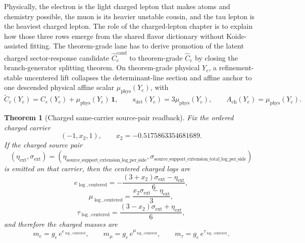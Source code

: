 \documentclass[11pt]{article}
\newtheorem{theorem}{Theorem}[section]
\begin{document}
Physically, the electron is the light charged lepton that makes atoms and chemistry possible, the
muon is its heavier unstable cousin, and the tau lepton is the heaviest charged lepton. The role
of the charged-lepton chapter is to explain how those three rows emerge from the shared flavor
dictionary without Koide-assisted fitting. The theorem-grade lane has to derive promotion of the
latent charged sector-response candidate \(\widehat C_e^{\mathrm{cand}}\) to theorem-grade
\(\widehat C_e\) by closing the branch-generator splitting theorem. On theorem-grade physical
\(Y_e\), a refinement-stable uncentered lift collapses the determinant-line section and affine
anchor to one descended physical affine scalar \(\mu_{\mathrm{phys}}(Y_e)\), with
\[
\widetilde C_e(Y_e)=\widehat C_e(Y_e)+\mu_{\mathrm{phys}}(Y_e)\,\mathbf 1,
\qquad
s_{\det}(Y_e)=3\mu_{\mathrm{phys}}(Y_e),
\qquad
A_{\mathrm{ch}}(Y_e)=\mu_{\mathrm{phys}}(Y_e).
\]

\begin{theorem}[Charged same-carrier source-pair readback]
Fix the ordered charged carrier
\[
(-1,x_2,1),
\qquad
x_2=-0.5175863354681689.
\]
If the charged source pair
\[
(\eta_{\mathrm{ext}},\sigma_{\mathrm{ext}})
=
(\eta_{\mathrm{source\_support\_extension\_log\_per\_side}},
\sigma_{\mathrm{source\_support\_extension\_total\_log\_per\_side}})
\]
is emitted on that carrier, then the centered charged logs are
\[
e_{\log,\mathrm{centered}}
=
-\frac{(3+x_2)\sigma_{\mathrm{ext}}-\eta_{\mathrm{ext}}}{6},
\]
\[
\mu_{\log,\mathrm{centered}}
=
\frac{x_2\sigma_{\mathrm{ext}}-\eta_{\mathrm{ext}}}{3},
\]
\[
\tau_{\log,\mathrm{centered}}
=
\frac{(3-x_2)\sigma_{\mathrm{ext}}+\eta_{\mathrm{ext}}}{6},
\]
and therefore the charged masses are
\[
m_e = g_e\,e^{e_{\log,\mathrm{centered}}},
\qquad
m_\mu = g_e\,e^{\mu_{\log,\mathrm{centered}}},
\qquad
m_\tau = g_e\,e^{\tau_{\log,\mathrm{centered}}}.
\]
\end{theorem}
\end{document}

